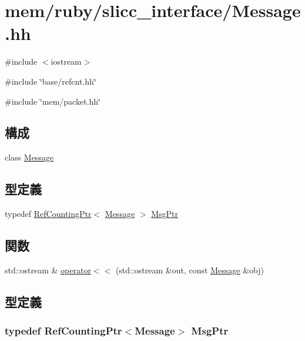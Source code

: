\hypertarget{Message_8hh}{
\section{mem/ruby/slicc\_\-interface/Message.hh}
\label{Message_8hh}
}
{\ttfamily \#include $<$iostream$>$}\par
{\ttfamily \#include \char`\"{}base/refcnt.hh\char`\"{}}\par
{\ttfamily \#include \char`\"{}mem/packet.hh\char`\"{}}\par
\subsection*{構成}
\begin{DoxyCompactItemize}
\item 
class \hyperlink{classMessage}{Message}
\end{DoxyCompactItemize}
\subsection*{型定義}
\begin{DoxyCompactItemize}
\item 
typedef \hyperlink{classRefCountingPtr}{RefCountingPtr}$<$ \hyperlink{classMessage}{Message} $>$ \hyperlink{Message_8hh_a1baf7c849877e0742a492b4528d579f0}{MsgPtr}
\end{DoxyCompactItemize}
\subsection*{関数}
\begin{DoxyCompactItemize}
\item 
std::ostream \& \hyperlink{Message_8hh_a2ffee80e920af5b05f2d20f90601654e}{operator$<$$<$} (std::ostream \&out, const \hyperlink{classMessage}{Message} \&obj)
\end{DoxyCompactItemize}


\subsection{型定義}
\hypertarget{Message_8hh_a1baf7c849877e0742a492b4528d579f0}{
\subsubsection[{MsgPtr}]{\setlength{\rightskip}{0pt plus 5cm}typedef {\bf RefCountingPtr}$<${\bf Message}$>$ {\bf MsgPtr}}}
\label{Message_8hh_a1baf7c849877e0742a492b4528d579f0}


